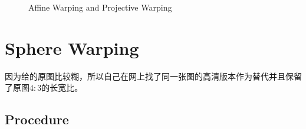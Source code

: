 \documentclass[UTF8]{ctexart}
\begin{document}
	\begin{figure}[htbp]
		\centering 
		\caption{Affine Warping and Projective Warping}
		\label{Fig.projective}
	\end{figure}
	
	\section*{Sphere Warping}
	因为给的原图比较糊，所以自己在网上找了同一张图的高清版本作为替代并且保留了原图$4:3$的长宽比。
	\subsection*{Procedure}\vspace{3ex}
\end{document}
